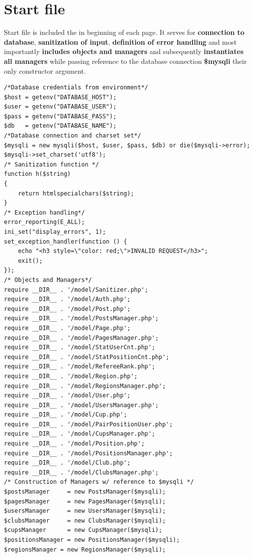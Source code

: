 \section{Start file}
Start file is included the in beginning of each page. It serves for \textbf{connection to database},  \textbf{sanitization of input}, \textbf{definition of error handling} and most importantly \textbf{includes objects and managers} and subsequently \textbf{instantiates all managers} while passing reference to the database connection \textbf{\$mysqli} their only constructor argument.
\begin{lstlisting}
/*Database credentials from environment*/
$host = getenv("DATABASE_HOST");
$user = getenv("DATABASE_USER");
$pass = getenv("DATABASE_PASS");
$db   = getenv("DATABASE_NAME");
/*Database connection and charset set*/
$mysqli = new mysqli($host, $user, $pass, $db) or die($mysqli->error);
$mysqli->set_charset('utf8');
/* Sanitization function */
function h($string)
{
    return htmlspecialchars($string);
}
/* Exception handling*/
error_reporting(E_ALL);
ini_set("display_errors", 1);
set_exception_handler(function () {
    echo "<h3 style=\"color: red;\">INVALID REQUEST</h3>";
    exit();
});
/* Objects and Managers*/
require __DIR__ . '/model/Sanitizer.php';
require __DIR__ . '/model/Auth.php';
require __DIR__ . '/model/Post.php';
require __DIR__ . '/model/PostsManager.php';
require __DIR__ . '/model/Page.php';
require __DIR__ . '/model/PagesManager.php';
require __DIR__ . '/model/StatUserCnt.php';
require __DIR__ . '/model/StatPositionCnt.php';
require __DIR__ . '/model/RefereeRank.php';
require __DIR__ . '/model/Region.php';
require __DIR__ . '/model/RegionsManager.php';
require __DIR__ . '/model/User.php';
require __DIR__ . '/model/UsersManager.php';
require __DIR__ . '/model/Cup.php';
require __DIR__ . '/model/PairPositionUser.php';
require __DIR__ . '/model/CupsManager.php';
require __DIR__ . '/model/Position.php';
require __DIR__ . '/model/PositionsManager.php';
require __DIR__ . '/model/Club.php';
require __DIR__ . '/model/ClubsManager.php';
/* Construction of Managers w/ reference to $mysqli */
$postsManager     = new PostsManager($mysqli);
$pagesManager     = new PagesManager($mysqli);
$usersManager     = new UsersManager($mysqli);
$clubsManager     = new ClubsManager($mysqli);
$cupsManager      = new CupsManager($mysqli);
$positionsManager = new PositionsManager($mysqli);
$regionsManager = new RegionsManager($mysqli);
\end{lstlisting}
